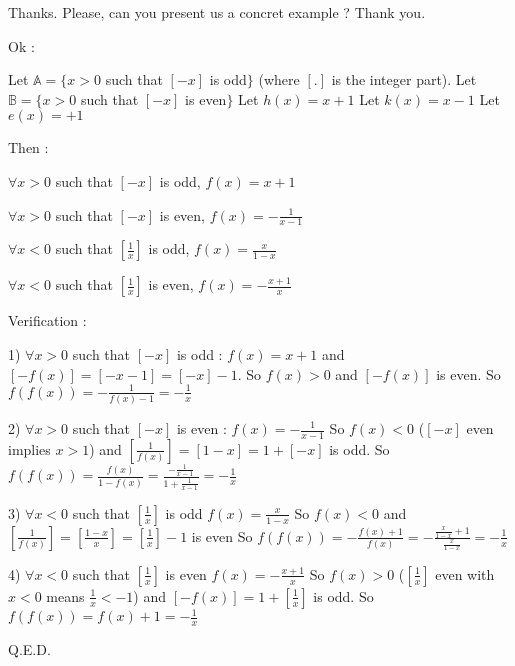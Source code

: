 \begin{solution}
	\begin{tcolorbox}Thanks. Please, can you present us a concret example ? Thank you.\end{tcolorbox}

Ok :

Let $ \mathbb{A}=\{x>0$ such that $ [-x]$ is odd$ \}$  (where $ [.]$ is the integer part).
Let $ \mathbb{B}=\{x>0$ such that $ [-x]$ is even$ \}$
Let $ h(x)=x+1$
Let $ k(x)=x-1$
Let $ e(x)=+1$

Then :

$ \forall x>0$ such that $ [-x]$ is odd, $ f(x)=x+1$

$ \forall x>0$ such that $ [-x]$ is even, $ f(x)=-\frac{1}{x-1}$

$ \forall x<0$ such that $ [\frac{1}{x}]$ is odd, $ f(x)=\frac{x}{1-x}$

$ \forall x<0$ such that $ [\frac{1}{x}]$ is even, $ f(x)=-\frac{x+1}{x}$

Verification :

1) $ \forall x>0$ such that $ [-x]$ is odd :
$ f(x)=x+1$ and $ [-f(x)]=[-x-1]=[-x]-1$. 
So $ f(x)>0$ and $ [-f(x)]$ is even.
So $ f(f(x))=-\frac{1}{f(x)-1}=-\frac{1}{x}$


2) $ \forall x>0$ such that $ [-x]$ is even :
$ f(x)=-\frac{1}{x-1}$
So $ f(x)<0$ ($ [-x]$ even implies $ x>1$) and $ [\frac{1}{f(x)}]=[1-x]=1+[-x]$ is odd.
So $ f(f(x))=\frac{f(x)}{1-f(x)}=\frac{-\frac{1}{x-1}}{1+\frac{1}{x-1}}=-\frac{1}{x}$


3) $ \forall x<0$ such that $ [\frac{1}{x}]$ is odd
$ f(x)=\frac{x}{1-x}$
So $ f(x)<0$ and $ [\frac{1}{f(x)}]=[\frac{1-x}{x}]=[\frac{1}{x}]-1$ is even
So $ f(f(x))=-\frac{f(x)+1}{f(x)}=-\frac{\frac{x}{1-x}+1}{\frac{x}{1-x}}=-\frac{1}{x}$


4) $ \forall x<0$ such that $ [\frac{1}{x}]$ is even
$ f(x)=-\frac{x+1}{x}$
So $ f(x)>0$ ($ [\frac{1}{x}]$ even with $ x<0$ means $ \frac{1}{x}<-1$) and $ [-f(x)]=1+[\frac{1}{x}]$ is odd.
So $ f(f(x))=f(x)+1=-\frac{1}{x}$

Q.E.D.
\end{solution}




